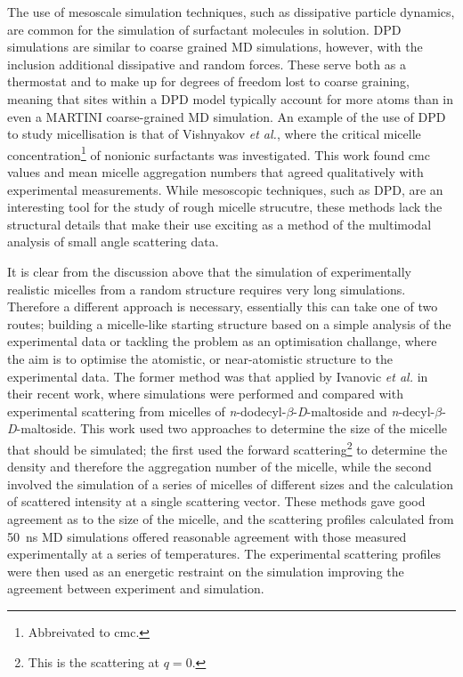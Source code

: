 The use of mesoscale simulation techniques, such as dissipative particle dynamics, are common for the simulation of surfactant molecules in solution.\autocite{shelley_computer_2000}
DPD simulations are similar to coarse grained MD simulations, however, with the inclusion additional dissipative and random forces.
These serve both as a thermostat and to make up for degrees of freedom lost to coarse graining, meaning that sites within a DPD model typically account for more atoms than in even a MARTINI coarse-grained MD simulation.
An example of the use of DPD to study micellisation is that of Vishnyakov \emph{et al.},\autocite{vishnyakov_prediction_2013} where the critical micelle concentration\footnote{Abbreivated to cmc.} of nonionic surfactants was investigated.
This work found cmc values and mean micelle aggregation numbers that agreed qualitatively with experimental measurements.
While mesoscopic techniques, such as DPD, are an interesting tool for the study of rough micelle strucutre, these methods lack the structural details that make their use exciting as a method of the multimodal analysis of small angle scattering data.

It is clear from the discussion above that the simulation of experimentally realistic micelles from a random structure requires very long simulations.
Therefore a different approach is necessary, essentially this can take one of two routes; building a micelle-like starting structure based on a simple analysis of the experimental data or tackling the problem as an optimisation challange, where the aim is to optimise the atomistic, or near-atomistic structure to the experimental data.
The former method was that applied by Ivanovic \emph{et al.} in their recent work,\autocite{ivanovic_temperature-dependent_2018} where simulations were performed and compared with experimental scattering from micelles of \emph{n}-dodecyl-$\beta$-\emph{D}-maltoside and \emph{n}-decyl-$\beta$-\emph{D}-maltoside.
This work used two approaches to determine the size of the micelle that should be simulated; the first used the forward scattering\footnote{This is the scattering at $q=0$.} to determine the density and therefore the aggregation number of the micelle,\autocite{lipfert_size_2007} while the second involved the simulation of a series of micelles of different sizes and the calculation of scattered intensity at a single scattering vector.
These methods gave good agreement as to the size of the micelle, and the scattering profiles calculated from \SI{50}{\nano\second} MD simulations offered reasonable agreement with those measured experimentally at a series of temperatures.
The experimental scattering profiles were then used as an energetic restraint on the simulation improving the agreement between experiment and simulation.

